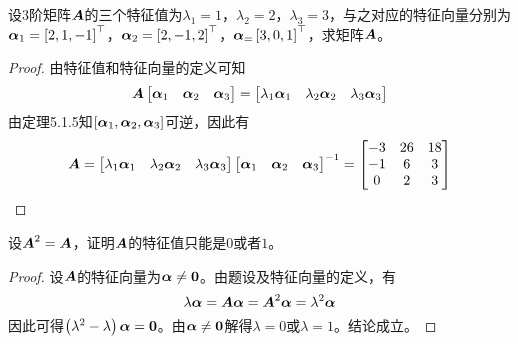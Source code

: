\begin{problem}
设\(3\)阶矩阵\(\boldsymbol{A}\)的三个特征值为\(\lambda_1=1\)，\(\lambda_2=2\)，\(\lambda_3=3\)，与之对应的特征向量分别为\(\boldsymbol{\alpha}_1=\left[ 2,1,-1 \right]^\top\)，\(\boldsymbol{\alpha}_2=\left[ 2,-1,2 \right]^\top\)，\(\boldsymbol{\alpha}_=\left[ 3,0,1 \right]^\top\)，求矩阵\(\boldsymbol{A}\)。
\end{problem}
\begin{proof}
    由特征值和特征向量的定义可知
    \begin{equation*}
        \boldsymbol{A}\begin{bmatrix}\boldsymbol{\alpha}_1&\boldsymbol{\alpha}_2&\boldsymbol{\alpha}_3\end{bmatrix}=\begin{bmatrix}\lambda_1\boldsymbol{\alpha}_1&\lambda_2\boldsymbol{\alpha}_2&\lambda_3\boldsymbol{\alpha}_3\end{bmatrix}
    \end{equation*}
    由定理5.1.5知\(\left[ \boldsymbol{\alpha}_1,\boldsymbol{\alpha}_2,\boldsymbol{\alpha}_3 \right]\)可逆，因此有
    \begin{equation*}
        \boldsymbol{A}=\begin{bmatrix}\lambda_1\boldsymbol{\alpha}_1&\lambda_2\boldsymbol{\alpha}_2&\lambda_3\boldsymbol{\alpha}_3\end{bmatrix}{\begin{bmatrix}\boldsymbol{\alpha}_1&\boldsymbol{\alpha}_2&\boldsymbol{\alpha}_3\end{bmatrix}}^{-1}=
        \begin{bmatrix}
            -3 & 26 & 18 \\
            -1 & 6  & 3  \\
            0  & 2  & 3
        \end{bmatrix}
    \end{equation*}
\end{proof}

\begin{problem}
设\(\boldsymbol{A}^2=\boldsymbol{A}\)，证明\(\boldsymbol{A}\)的特征值只能是\(0\)或者\(1\)。
\end{problem}
\begin{proof}
    设\(\boldsymbol{A}\)的特征向量为\(\boldsymbol{\alpha}\neq\boldsymbol{0}\)。由题设及特征向量的定义，有
    \begin{equation*}
        \lambda\boldsymbol{\alpha}=\boldsymbol{A}\boldsymbol{\alpha}=\boldsymbol{A}^2\boldsymbol{\alpha}=\lambda^2\boldsymbol{\alpha}
    \end{equation*}
    因此可得\(\left( \lambda^2-\lambda \right)\boldsymbol{\alpha}=\boldsymbol{0}\)。由\(\boldsymbol{\alpha}\neq\boldsymbol{0}\)解得\(\lambda=0\)或\(\lambda=1\)。结论成立。
\end{proof}

